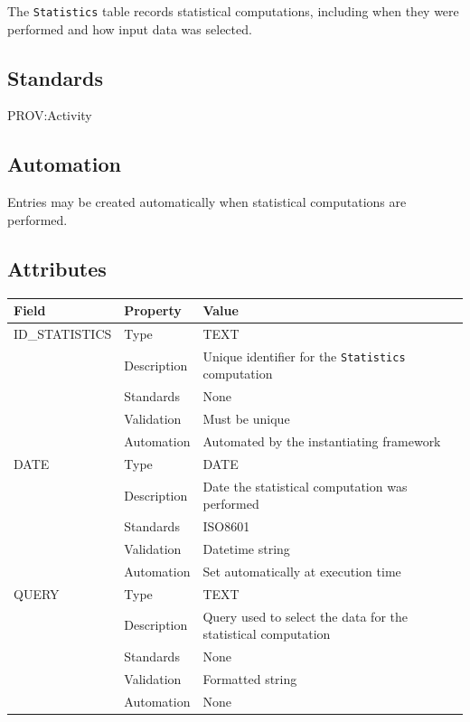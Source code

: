 \documentclass[
]{article}
\newcounter{none} %
\begin{document}
The \texttt{Statistics} table records statistical computations,
including when they were performed and how input data was selected.

\subsection{Standards}\label{standards-33}

PROV:Activity

\subsection{Automation}\label{automation-33}

Entries may be created automatically when statistical computations are
performed.

\subsection{Attributes}\label{attributes-28}

{\def\LTcaptype{none} %
\begin{longtable}[]{@{}
  >{\raggedright\arraybackslash}p{}
  >{\raggedright\arraybackslash}p{}
  >{\raggedright\arraybackslash}p{}@{}}
\toprule\noalign{}
\begin{minipage}[b]{\linewidth}\raggedright
Field
\end{minipage} & \begin{minipage}[b]{\linewidth}\raggedright
Property
\end{minipage} & \begin{minipage}[b]{\linewidth}\raggedright
Value
\end{minipage} \\
\midrule\noalign{}
\endhead
\bottomrule\noalign{}
\endlastfoot
ID\_STATISTICS & Type & TEXT \\
& Description & Unique identifier for the \texttt{Statistics}
computation \\
& Standards & None \\
& Validation & Must be unique \\
& Automation & Automated by the instantiating framework \\
DATE & Type & DATE \\
& Description & Date the statistical computation was performed \\
& Standards & ISO8601 \\
& Validation & Datetime string \\
& Automation & Set automatically at execution time \\
QUERY & Type & TEXT \\
& Description & Query used to select the data for the statistical
computation \\
& Standards & None \\
& Validation & Formatted string \\
& Automation & None \\
\end{longtable}
}
\end{document}
